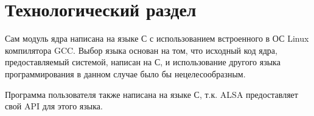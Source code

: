 \chapter{Технологический раздел}

Сам модуль ядра написана на языке С с использованием встроенного в ОС Linux компилятора GCC. Выбор языка основан на том, что исходный код ядра, предоставляемый системой, написан на С,  и использование другого языка программирования в данном случае было бы нецелесообразным. 

Программа пользователя также написана на языке С, т.к. ALSA предоставляет свой API для этого языка.